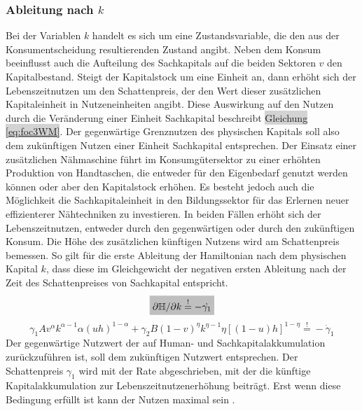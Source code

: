 \subsubsection*{Ableitung nach $k$}
Bei der Variablen $k$ handelt es sich um eine Zustandsvariable, die den aus der Konsumentscheidung resultierenden Zustand angibt. Neben dem Konsum beeinflusst auch die Aufteilung des Sachkapitals auf die beiden Sektoren $v$ den Kapitalbestand. Steigt der Kapitalstock um eine Einheit an, dann erhöht sich der Lebenszeitnutzen um den Schattenpreis, der den Wert dieser zusätzlichen Kapitaleinheit in Nutzeneinheiten angibt. Diese Auswirkung auf den Nutzen durch die Veränderung einer Einheit Sachkapital beschreibt \colorbox{lightgray}{Gleichung \eqref{eq:foc3WM}}. Der gegenwärtige Grenznutzen des physischen Kapitals soll also dem zukünftigen Nutzen einer Einheit Sachkapital entsprechen. Der Einsatz einer zusätzlichen Nähmaschine führt im Konsumgütersektor zu einer erhöhten Produktion von Handtaschen, die entweder für den Eigenbedarf genutzt werden können oder aber den Kapitalstock erhöhen. Es besteht jedoch auch die Möglichkeit die Sachkapitaleinheit in den Bildungssektor für das Erlernen neuer effizienterer Nähtechniken zu investieren. In beiden Fällen erhöht sich der Lebenszeitnutzen, entweder durch den gegenwärtigen oder durch den zukünftigen Konsum. Die Höhe des zusätzlichen künftigen Nutzens wird am Schattenpreis bemessen. So gilt für die erste Ableitung der Hamiltonian nach dem physischen Kapital $k$, dass diese im Gleichgewicht der negativen ersten Ableitung nach der Zeit des Schattenpreises von Sachkapital entspricht. 
%
\begin{equation}
	\colorbox{lightgray}{$\partial\mathbb{H}/\partial k\overset{!}{=}-\dot{\gamma_1}$}\label{nachK}
\end{equation}
%
\begin{equation}
	\gamma_{1}A v^{\alpha}k^{\alpha -1} \alpha(u h)^{1- \alpha} + \gamma_{2}B(1- v)^{\eta} k^{\eta -1} \eta \left [ (1-u)h \right ]^{1- \eta}\overset{!}{=} - \dot{\gamma}_{1}\label{BedingungFoc3WM}
\end{equation}
%
Der gegenwärtige Nutzwert der auf Human- und Sachkapitalakkumulation zurückzuführen ist, soll dem zukünftigen Nutzwert entsprechen. Der Schattenpreis $\gamma_1$ wird mit der Rate abgeschrieben, mit der die künftige Kapitalakkumulation zur Lebenszeitnutzenerhöhung beiträgt. Erst wenn diese Bedingung erfüllt ist kann der Nutzen maximal sein \cite{Chiang.2000}.
%
